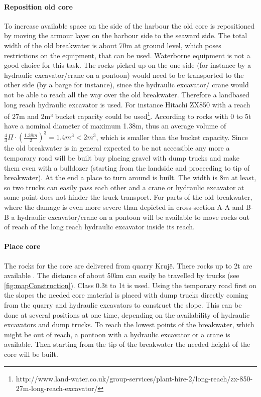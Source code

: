\paragraph{Reposition old core}
To increase available space on the side of the harbour the old core is repositioned by moving the armour layer on the harbour side to the seaward side.
The total width of the old breakwater is about 70m at ground level, which poses restrictions on the equipment, that can be used.
Waterborne equipment is not a good choice for this task.
The rocks picked up on the one side (for instance by a hydraulic excavator/crane on a pontoon) would need to be transported to the other side (by a barge for instance), since the hydraulic excavator/ crane would not be able to reach all the way over the old breakwater.
Therefore a landbased long reach hydraulic excavator is used.
For instance Hitachi ZX850 with a reach of 27m and 2m³ bucket capacity could be used\footnote{http://www.land-water.co.uk/group-services/plant-hire-2/long-reach/zx-850-27m-long-reach-excavator/}.
According to \citet{cem} rocks with 0 to 5t have a nominal diameter of maximum 1.38m, thus an average volume of $\frac{4}{3}\Pi \cdot \left(\frac{1.38m}{2}\right)^{3}=1.4m^3<2m^3$, which is smaller than the bucket capacity.
Since the old breakwater is in general expected to be not accessible any more a temporary road will be built buy placing gravel with dump trucks and make them even with a bulldozer (starting from the landside and proceeding to tip of breakwater).
At the end a place to turn around is built.
The width is 8m at least, so two trucks can easily pass each other and a crane or hydraulic excavator at some point does not hinder the truck transport.
For parts of the old breakwater, where the damage is even more severe than depicted in cross-section A-A and B-B a hydraulic excavator/crane on a pontoon will be available to move rocks out of reach of the long reach hydraulic excavator inside its reach.

\paragraph{Place core}
The rocks for the core are delivered from quarry Kruj\"{e}.
There rocks up to 2t are available \citep{MScRomano}.
The distance of about 50km can easily be travelled by trucks (see \ref{fig:mapConstruction}). 
Class 0.3t to 1t is used.
Using the temporary road first on the slopes the needed core material is placed with dump trucks directly coming from the quarry and hydraulic excavators to construct the slope.
This can be done at several positions at one time, depending on the availability of hydraulic excavators and dump trucks.
To reach the lowest points of the breakwater, which might be out of reach, a pontoon with a hydraulic excavator or a crane is available.
Then starting from the tip of the breakwater the needed height of the core will be built.

